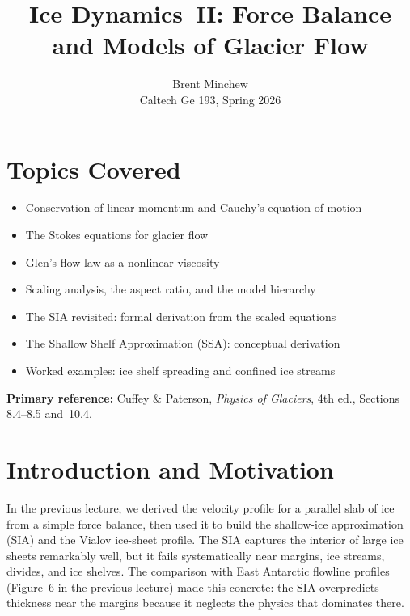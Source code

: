 \documentclass[11pt]{article}
\title{Ice Dynamics~II: Force Balance and Models of Glacier Flow}
\author{Brent Minchew \\Caltech Ge 193, Spring 2026}
\date{}
\begin{document}
\maketitle

\section*{Topics Covered}

\begin{itemize}
  \item Conservation of linear momentum and Cauchy's equation of motion
  \item The Stokes equations for glacier flow
  \item Glen's flow law as a nonlinear viscosity
  \item Scaling analysis, the aspect ratio, and the model hierarchy
  \item The SIA revisited: formal derivation from the scaled equations
  \item The Shallow Shelf Approximation (SSA): conceptual derivation
  \item Worked examples: ice shelf spreading and confined ice streams
\end{itemize}

\noindent\textbf{Primary reference:} Cuffey \& Paterson, \textit{Physics of Glaciers}, 4th ed., Sections 8.4--8.5 and~10.4.

\section{Introduction and Motivation}

In the previous lecture, we derived the velocity profile for a parallel slab of ice from a simple force balance, then used it to build the shallow-ice approximation (SIA) and the Vialov ice-sheet profile.  The SIA captures the interior of large ice sheets remarkably well, but it fails systematically near margins, ice streams, divides, and ice shelves.  The comparison with East Antarctic flowline profiles (Figure~6 in the previous lecture) made this concrete: the SIA overpredicts thickness near the margins because it neglects the physics that dominates there.
\end{document}
